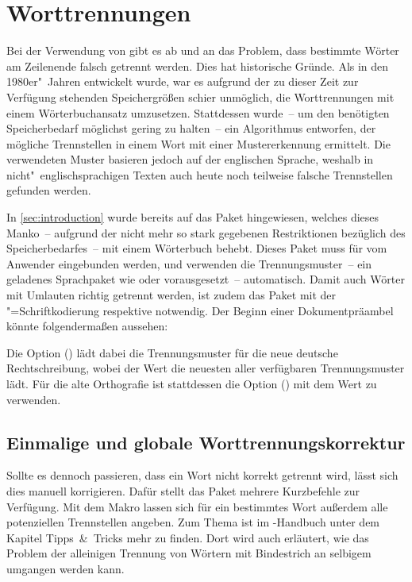 \documentclass[%
  english,ngerman,%
  cdgeometry=no,DIV=12,%
  automark,%
  listof=toc,%
]{tudscrartcl}
\begin{document}
\section{Worttrennungen}
\label{sec:hyphenation}%
%
Bei der Verwendung von  gibt es ab und an das Problem, dass 
bestimmte Wörter am Zeilenende falsch getrennt werden. Dies hat historische 
Gründe. Als  in den 1980er"~Jahren entwickelt wurde, war es 
aufgrund der zu dieser Zeit zur Verfügung stehenden Speichergrößen schier 
unmöglich, die Worttrennungen mit einem Wörterbuchansatz umzusetzen. 
Stattdessen wurde~-- um den benötigten Speicherbedarf möglichst gering zu 
halten~-- ein Algorithmus entworfen, der mögliche Trennstellen in einem Wort 
mit einer Mustererkennung ermittelt. Die verwendeten Muster basieren jedoch 
auf der englischen Sprache, weshalb in nicht"~englischsprachigen Texten auch 
heute noch teilweise falsche Trennstellen gefunden werden.

In \autoref{sec:introduction} wurde bereits auf das Paket 
 hingewiesen, welches dieses Manko~-- aufgrund der nicht 
mehr so stark gegebenen Restriktionen bezüglich des Speicherbedarfes~-- mit 
einem Wörterbuch behebt. Dieses Paket muss für  vom Anwender 
eingebunden werden,  und  verwenden die 
Trennungsmuster~-- ein geladenes Sprachpaket wie  oder 
 vorausgesetzt~-- automatisch. Damit auch Wörter mit Umlauten 
richtig getrennt werden, ist zudem das Paket  mit der 
"=Schriftkodierung respektive  notwendig. Der 
Beginn einer Dokumentpräambel könnte folgendermaßen aussehen:
%
%
Die Option () lädt dabei die Trennungsmuster 
für die neue deutsche Rechtschreibung, wobei der Wert  
die neuesten aller verfügbaren Trennungsmuster lädt. Für die alte Orthografie 
ist stattdessen die Option () mit dem Wert 
 zu verwenden.


\subsection{Einmalige und globale Worttrennungskorrektur}
Sollte es dennoch passieren, dass ein Wort nicht korrekt getrennt wird, lässt
sich dies manuell korrigieren. Dafür stellt das Paket  mehrere 
Kurzbefehle zur Verfügung. Mit dem Makro  lassen sich für 
ein bestimmtes Wort außerdem alle potenziellen Trennstellen angeben. Zum Thema 
ist im \TUDScript-Handbuch unter dem Kapitel Tipps~\&~Tricks mehr zu finden. 
Dort wird auch erläutert, wie das Problem der alleinigen Trennung von Wörtern 
mit Bindestrich an selbigem umgangen werden kann.
\end{document}
